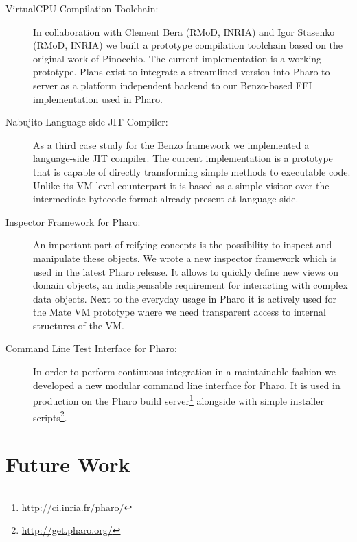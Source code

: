 \begin{description}
	\item[VirtualCPU Compilation Toolchain:]
In collaboration with Clement Bera (RMoD, INRIA) and Igor Stasenko (RMoD, INRIA) we built a prototype compilation toolchain based on the original work of Pinocchio.
The current implementation is a working prototype.
Plans exist to integrate a streamlined version into Pharo to server as a platform independent backend to our Benzo-based FFI implementation used in Pharo.

	\item[Nabujito Language-side JIT Compiler:]
As a third case study for the Benzo framework we implemented a language-side JIT compiler. 
The current implementation is a prototype that is capable of directly transforming simple methods to executable code.
Unlike its VM-level counterpart it is based as a simple visitor over the intermediate bytecode format already present at language-side.

	\item[Inspector Framework for Pharo:] 
An important part of reifying concepts is the possibility to inspect and manipulate these objects.
We wrote a new inspector framework which is used in the latest Pharo release.
It allows to quickly define new views on domain objects, an indispensable requirement for interacting with complex data objects.
Next to the everyday usage in Pharo it is actively used for the Mate VM prototype where we need transparent access to internal structures of the VM.

	\item[Command Line Test Interface for Pharo:]
In order to perform continuous integration in a maintainable fashion we developed a new modular command line interface for Pharo. 
It is used in production on the Pharo build server\footnote{\url{http://ci.inria.fr/pharo/}} alongside with simple installer scripts\footnote{\url{http://get.pharo.org/}}.
\end{description}


\section{Future Work}


